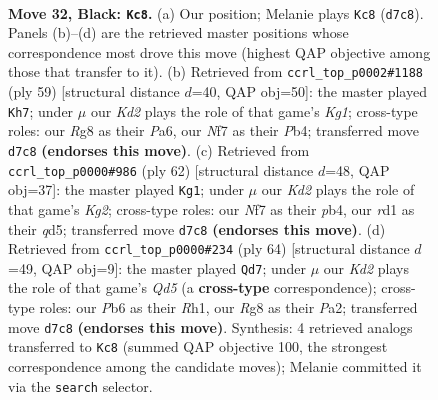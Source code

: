 \documentclass[11pt]{article}
\begin{document}
\clearpage

\begin{figure}[p]\centering
\begin{subfigure}{0.46\textwidth}\centering
\resizebox{\linewidth}{!}{%
\newchessgame
\chessboard[
  setfen={6r1/p1pk1npp/1p2pq2/2p5/5PP1/2P1Q2P/1P6/2KR4 b - - 4 32},
  showmover=false,
  pgfstyle=straightmove, color=movearrow, markmove={d7-c8}
]}
\caption{}
\end{subfigure}\hfill
\begin{subfigure}{0.46\textwidth}\centering
\resizebox{\linewidth}{!}{%
\newchessgame
\chessboard[
  setfen={2R3k1/5p2/p3q1p1/5p1p/1p3P2/1P2P2P/P1Q2P1K/3r4 b - - 0 30},
  showmover=false,
  pgfstyle=straightmove, color=movearrow, markmove={g8-h7}
]}
\caption{}
\end{subfigure}
\\[4pt]
\begin{subfigure}{0.46\textwidth}\centering
\resizebox{\linewidth}{!}{%
\newchessgame
\chessboard[
  setfen={3r2k1/5pp1/8/p2qP2p/1p5P/1P4P1/P3QPK1/R7 w - - 1 32},
  showmover=false,
  pgfstyle=straightmove, color=movearrow, markmove={g2-g1}
]}
\caption{}
\end{subfigure}\hfill
\begin{subfigure}{0.46\textwidth}\centering
\resizebox{\linewidth}{!}{%
\newchessgame
\chessboard[
  setfen={4r1k1/2p2p2/p1P1q2p/1p1Q4/4p3/1P2P1P1/P4P2/1K5R w - - 1 33},
  showmover=false,
  pgfstyle=straightmove, color=movearrow, markmove={d5-d7}
]}
\caption{}
\end{subfigure}
\caption{\textbf{Move 32, Black: \texttt{Kc8}.} (a) Our position; Melanie plays \texttt{Kc8} (\texttt{d7c8}). Panels (b)--(d) are the retrieved master positions whose correspondence most drove this move (highest QAP objective among those that transfer to it). (b) Retrieved from \texttt{ccrl\_top\_p0002\#1188} (ply 59) [structural distance $d$=40, QAP obj=50]: the master played \texttt{Kh7}; under $\mu$ our \emph{Kd2} plays the role of that game's \emph{Kg1}; cross-type roles: our \emph{R}g8 as their \emph{P}a6, our \emph{N}f7 as their \emph{P}b4; transferred move \texttt{d7c8} \textbf{(endorses this move)}. (c) Retrieved from \texttt{ccrl\_top\_p0000\#986} (ply 62) [structural distance $d$=48, QAP obj=37]: the master played \texttt{Kg1}; under $\mu$ our \emph{Kd2} plays the role of that game's \emph{Kg2}; cross-type roles: our \emph{N}f7 as their \emph{p}b4, our \emph{r}d1 as their \emph{q}d5; transferred move \texttt{d7c8} \textbf{(endorses this move)}. (d) Retrieved from \texttt{ccrl\_top\_p0000\#234} (ply 64) [structural distance $d$=49, QAP obj=9]: the master played \texttt{Qd7}; under $\mu$ our \emph{Kd2} plays the role of that game's \emph{Qd5} (a \textbf{cross-type} correspondence); cross-type roles: our \emph{P}b6 as their \emph{R}h1, our \emph{R}g8 as their \emph{P}a2; transferred move \texttt{d7c8} \textbf{(endorses this move)}. Synthesis: 4 retrieved analogs transferred to \texttt{Kc8} (summed QAP objective 100, the strongest correspondence among the candidate moves); Melanie committed it via the \texttt{search} selector.}
\label{fig:thought-m63}
\end{figure}
\end{document}
